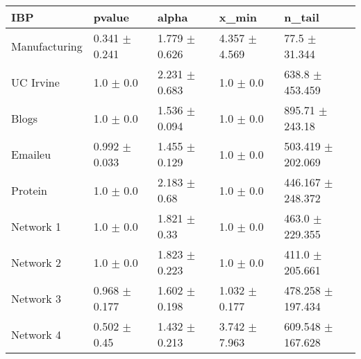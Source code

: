\begin{tabular}{@{}lllll@{}}
\toprule

\textbf{IBP} & pvalue & alpha & x\_min & n\_tail \\\midrule

Manufacturing & 0.341 \(\pm\) 0.241 & 1.779 \(\pm\) 0.626 & 4.357
\(\pm\) 4.569 & 77.5 \(\pm\) 31.344 \\
UC Irvine & 1.0 \(\pm\) 0.0 & 2.231 \(\pm\) 0.683 & 1.0 \(\pm\)
0.0 & 638.8 \(\pm\) 453.459 \\
Blogs & 1.0 \(\pm\) 0.0 & 1.536 \(\pm\) 0.094 & 1.0 \(\pm\) 0.0 & 895.71
\(\pm\) 243.18 \\
Emaileu & 0.992 \(\pm\) 0.033 & 1.455 \(\pm\) 0.129 & 1.0 \(\pm\)
0.0 & 503.419 \(\pm\) 202.069 \\
Protein & 1.0 \(\pm\) 0.0 & 2.183 \(\pm\) 0.68 & 1.0 \(\pm\)
0.0 & 446.167 \(\pm\) 248.372 \\
Network 1 & 1.0 \(\pm\) 0.0 & 1.821 \(\pm\) 0.33 & 1.0 \(\pm\)
0.0 & 463.0 \(\pm\) 229.355 \\
Network 2 & 1.0 \(\pm\) 0.0 & 1.823 \(\pm\) 0.223 & 1.0 \(\pm\)
0.0 & 411.0 \(\pm\) 205.661 \\
Network 3 & 0.968 \(\pm\) 0.177 & 1.602 \(\pm\) 0.198 & 1.032 \(\pm\)
0.177 & 478.258 \(\pm\) 197.434 \\
Network 4 & 0.502 \(\pm\) 0.45 & 1.432 \(\pm\) 0.213 & 3.742 \(\pm\)
7.963 & 609.548 \(\pm\) 167.628 \\

\bottomrule
\end{tabular}
